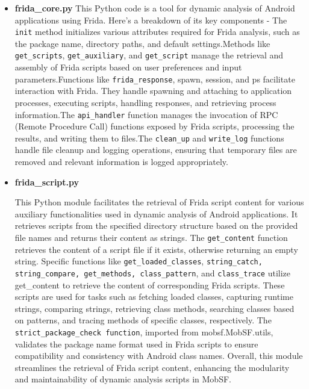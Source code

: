 \documentclass{report}
\begin{document}
\begin{itemize}
\begin{itemize}
        \item \textbf{frida\_core.py}
        This Python code is a tool for dynamic analysis of Android applications using Frida. Here's a breakdown of its key components - The \texttt{init} method initializes various attributes required for Frida analysis, such as the package name, directory paths, and default settings.Methods like \texttt{get\_scripts}, \texttt{get\_auxiliary}, and \texttt{get\_script} manage the retrieval and assembly of Frida scripts based on user preferences and input parameters.Functions like \texttt{frida\_response}, spawn, session, and ps facilitate interaction with Frida. They handle spawning and attaching to application processes, executing scripts, handling responses, and retrieving process information.The \texttt{api\_handler} function manages the invocation of RPC (Remote Procedure Call) functions exposed by Frida scripts, processing the results, and writing them to files.The \texttt{clean\_up} and \texttt{write\_log} functions handle file cleanup and logging operations, ensuring that temporary files are removed and relevant information is logged appropriately.

        \item \textbf {frida\_script.py}
        
        This Python module facilitates the retrieval of Frida script content for various auxiliary functionalities used in dynamic analysis of Android applications. It retrieves scripts from the specified directory structure based on the provided file names and returns their content as strings. The \texttt{get\_content} function retrieves the content of a script file if it exists, otherwise returning an empty string. \newline        
        Specific functions like \texttt{get\_loaded\_classes}, \texttt{string\_catch, string\_compare, get\_methods, class\_pattern}, and \texttt{class\_trace} utilize get\_content to retrieve the content of corresponding Frida scripts. These scripts are used for tasks such as fetching loaded classes, capturing runtime strings, comparing strings, retrieving class methods, searching classes based on patterns, and tracing methods of specific classes, respectively. \newline       
        The  \texttt{strict\_package\_check function}, imported from mobsf.MobSF.utils, validates the package name format used in Frida scripts to ensure compatibility and consistency with Android class names. Overall, this module streamlines the retrieval of Frida script content, enhancing the modularity and maintainability of dynamic analysis scripts in MobSF.


\end{itemize}
\end{itemize}
\end{document}
